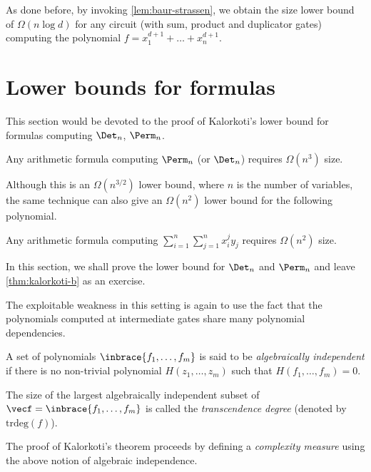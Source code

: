As done before, by invoking \autoref{lem:baur-strassen}, we obtain the size lower bound of $\Omega(n\log d)$ for any circuit (with sum, product and duplicator gates) computing the polynomial $f = x_1^{d+1}+\dots+x_n^{d+1}$.



\section{Lower bounds for formulas}\label{sec:Kalorkoti}

This section would be devoted to the proof of Kalorkoti's lower bound \cite{k85} for formulas computing $\Det_n$, $\Perm_n$.

\begin{theorem}[\cite{k85}]\label{thm:kalorkoti}
  Any arithmetic formula computing $\Perm_n$ (or $\Det_n$) requires $\Omega(n^3)$ size.
\end{theorem}

Although this is an $\Omega(n^{3/2})$ lower bound, where $n$ is the number of variables, the same technique can also give an $\Omega(n^2)$ lower bound for the following polynomial.

\begin{theorem}[\cite{k85}]\label{thm:kalorkoti-b}
  Any arithmetic formula computing $\sum_{i=1}^n \sum_{j=1}^n x_i^j y_j$ requires $\Omega(n^2)$ size.
\end{theorem}

In this section, we shall prove the lower bound for $\Det_n$ and $\Perm_n$ and leave \autoref{thm:kalorkoti-b} as an exercise. 

The exploitable weakness in this setting is again to use the fact that the polynomials computed at intermediate gates share many polynomial dependencies.

\begin{definition}
  A set of polynomials $\inbrace{f_1,\dots, f_m}$ is said to be \emph{algebraically independent} if there is no non-trivial polynomial $H(z_1,\dots, z_m)$ such that $H(f_1,\dots, f_m)=0$.

  The size of the largest algebraically independent subset of $\vecf=\inbrace{f_1,\dots, f_m}$ is called the \emph{transcendence degree} (denoted by $\mathrm{trdeg}(f)$).
\end{definition}
The proof of Kalorkoti's theorem proceeds by defining a \emph{complexity measure} using the above notion of algebraic independence.
\\


